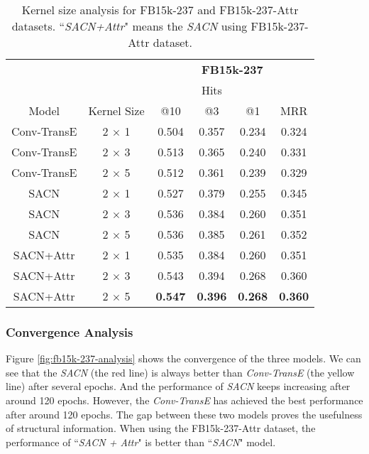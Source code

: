 \documentclass[letterpaper]{article} \usepackage{aaai19}  \usepackage{times}  \usepackage{helvet}  \usepackage{courier}  \usepackage{url}  \usepackage{graphicx}  \usepackage{amsmath}
\begin{document}
\begin{table}
\caption{Kernel size analysis for FB15k-237 and FB15k-237-Attr datasets. ``{\it  SACN+Attr}" means the {\it SACN} using FB15k-237-Attr dataset.}
    \bigskip
    \label{tab:table4}
    \tabcolsep=0.155cm
    \centering
\begin{tabular}{c|c|c|c|c|c}
        \hline
        & & \multicolumn{4}{c}{\textbf{FB15k-237}} \\
        \cline{3-6}
        & & \multicolumn{3}{c|}{Hits} & \multicolumn{1}{c}{}  \\
        \cline{3-6}
        Model & Kernel Size & @10 & @3 & @1 & MRR  \\
        \hline
        \hline
Conv-TransE & 2 $\times$ 1 & 0.504 & 0.357 & 0.234 & 0.324 \\
        \hline
        Conv-TransE & 2 $\times$ 3  & 0.513  & 0.365 & 0.240 & 0.331  \\
        \hline
        Conv-TransE & 2 $\times$ 5 & 0.512 & 0.361 & 0.239 & 0.329  \\
        \hline
        \hline
        SACN & 2 $\times$ 1  & 0.527 & 0.379 & 0.255 & 0.345  \\
\hline
        SACN & 2 $\times$ 3 & 0.536 & 0.384 & 0.260 & 0.351  \\
        \hline
        SACN & 2 $\times$ 5  & 0.536 & 0.385 & 0.261 & 0.352  \\
        \hline
        \hline
        SACN+Attr & 2 $\times$ 1 & 0.535 & 0.384 & 0.260 & 0.351\\
        \hline
        SACN+Attr & 2 $\times$ 3 & 0.543 & 0.394 & 0.268 & 0.360  \\
        \hline
        SACN+Attr & 2 $\times$ 5 & \textbf{0.547} & \textbf{0.396} & \textbf{0.268} & \textbf{0.360} \\
        \hline


    \end{tabular}
\end{table}

\subsubsection{Convergence Analysis}
Figure \ref{fig:fb15k-237-analysis} shows the convergence of the three models. 
We can see that the {\it SACN} (the red line) is always better than {\it Conv-TransE} (the yellow line) after several epochs. And the performance of {\it SACN} keeps increasing after around 120 epochs. However, the {\it Conv-TransE} has achieved the best performance after around 120 epochs. The gap between these two models proves the usefulness of structural information.
When using the FB15k-237-Attr dataset, the performance of ``{\it SACN + Attr}" is better than ``{\it SACN}" model. 
\end{document}
